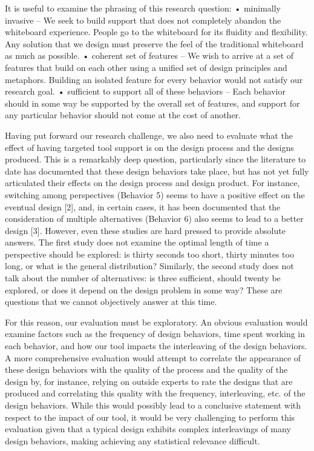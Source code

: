 It is useful to examine the phrasing of this research question:
•	minimally invasive – We seek to build support that does not completely abandon the whiteboard experience. People go to the whiteboard for its fluidity and flexibility. Any solution that we design must preserve the feel of the traditional whiteboard as much as possible.
•	coherent set of features – We wish to arrive at a set of features that build on each other using a unified set of design principles and metaphors. Building an isolated feature for every behavior would not satisfy our research goal. 
•	sufficient to support all of these behaviors – Each behavior should in some way be supported by the overall set of features, and support for any particular behavior should not come at the cost of another. 

Having put forward our research challenge, we also need to evaluate what the effect of having targeted tool support is on the design process and the designs produced. This is a remarkably deep question, particularly since the literature to date has documented that these design behaviors take place, but has not yet fully articulated their effects on the design process and design product. For instance, switching among perspectives (Behavior 5) seems to have a positive effect on the eventual design [2], and, in certain cases, it has been documented that the consideration of multiple alternatives (Behavior 6) also seems to lead to a better design [3]. However, even these studies are hard pressed to provide absolute answers. The first study does not examine the optimal length of time a perspective should be explored: is thirty seconds too short, thirty minutes too long, or what is the general distribution? Similarly, the second study does not talk about the number of alternatives: is three sufficient, should twenty be explored, or does it depend on the design problem in some way? These are questions that we cannot objectively answer at this time. 

For this reason, our evaluation must be exploratory. An obvious evaluation would examine factors such as the frequency of design behaviors, time spent working in each behavior, and how our tool impacts the interleaving of the design behaviors. A more comprehensive evaluation would attempt to correlate the appearance of these design behaviors with the quality of the process and the quality of the design by, for instance, relying on outside experts to rate the designs that are produced and correlating this quality with the frequency, interleaving, etc. of the design behaviors. While this would possibly lead to a conclusive statement with respect to the impact of our tool, it would be very challenging to perform this evaluation given that a typical design exhibits complex interleavings of many design behaviors, making achieving any statistical relevance difficult. 

